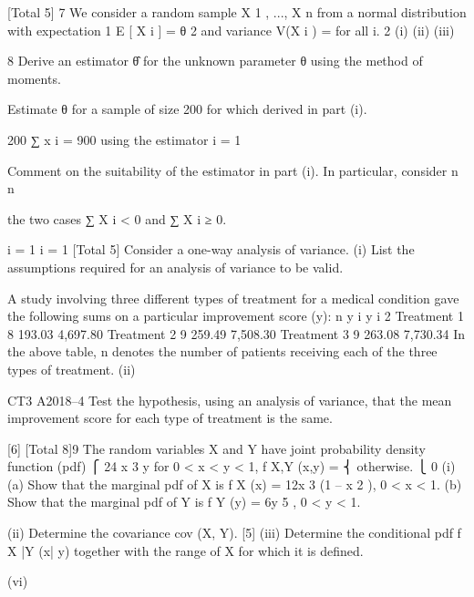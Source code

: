 \documentclass[a4paper,12pt]{article}
\begin{document}
\begin{enumerate}

[Total 5]
7
We consider a random sample X 1 , ..., X n from a normal distribution with expectation
1
E [ X i ] = θ 2 and variance V(X i ) =  for all i.
2
(i)
(ii)
(iii)


8
Derive an estimator θ̂ for the unknown parameter θ using the method of
moments.

Estimate θ for a sample of size 200 for which
derived in part (i).

200
∑ x i = 900 using the estimator
i = 1

Comment on the suitability of the estimator in part (i). In particular, consider
n
n


the two cases ∑ X i < 0 and ∑ X i ≥ 0.

i = 1
i = 1
[Total 5]
Consider a one-way analysis of variance.
(i)
List the assumptions required for an analysis of variance to be valid.

A study involving three different types of treatment for a medical condition gave the
following sums on a particular improvement score (y):
n \sigma y i \sigma y i 2
Treatment 1 8 193.03 4,697.80
Treatment 2 9 259.49 7,508.30
Treatment 3 9 263.08 7,730.34
In the above table, n denotes the number of patients receiving each of the three types
of treatment.
(ii)


CT3 A2018–4
Test the hypothesis, using an analysis of variance, that the mean improvement
score for each type of treatment is the same.

[6]
[Total 8]9
The random variables X and Y have joint probability density function (pdf)
⎧ 24 x 3 y for 0 < x < y < 1,
f X,Y (x,y) = ⎨
otherwise.
⎩ 0
(i)
(a)
Show that the marginal pdf of X is
f X   (x) = 12x 3 (1 – x 2 ), 0 <
x < 1.
(b)
Show that the marginal pdf of Y is f Y   (y) = 6y 5 , 0 < y < 1.


(ii) Determine the covariance cov (X, Y).
[5]
(iii) Determine the conditional pdf f X |Y (x| y) together with the range of X for which
it is defined. 


(vi)



\end{enumerate}
\end{document}

